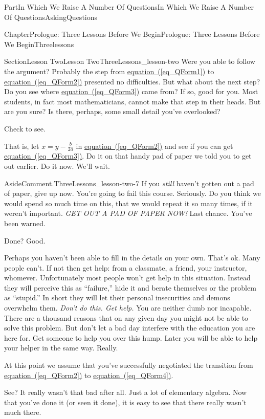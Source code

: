\documentclass[oneside,10pt,]{book}
\newcommand{\xreffont}{\relax}
\numberwithin{equation}{part}
\begin{document}
\begin{partptx}{Part}{In Which We Raise A Number Of Questions}{}{In Which We Raise A Number Of Questions}{}{}{AskingQuestions}
\begin{chapterptx}{Chapter}{Prologue: Three Lessons Before We Begin}{}{Prologue: Three Lessons Before We Begin}{}{}{Threelessons}
\begin{sectionptx}{Section}{Lesson Two}{}{Lesson Two}{}{}{ThreeLessons_lesson-two}
Were you able to follow the argument?  Probably the step from \hyperref[eq_QForm1]{equation~({\xreffont\ref{eq_QForm1}})} to \hyperref[eq_QForm2]{equation~({\xreffont\ref{eq_QForm2}})} presented no difficulties.  But what about the next step?  Do you see where \hyperref[eq_QForm3]{equation~({\xreffont\ref{eq_QForm3}})} came from?  If so, good for you. Most students, in fact most mathematicians, cannot make that step in their heads.  But are you sure?  Is there, perhaps, some small detail you've overlooked?%
\par
Check to see.%
\par
That is, let \(x=y-\frac{b}{2a}\) in \hyperref[eq_QForm2]{equation~({\xreffont\ref{eq_QForm2}})} and see if you can get \hyperref[eq_QForm3]{equation~({\xreffont\ref{eq_QForm3}})}.  Do it on that handy pad of paper we told you to get out earlier.  Do it now.  We'll wait.%
\begin{aside}{Aside}{Comment.}{ThreeLessons_lesson-two-7}%
If you \emph{still} haven't gotten out a pad of paper, give up now.  You're going to fail this course.  Seriously. Do you think we would spend so much time on this, that we would repeat it so many times, if it weren't important. \emph{\emph{GET OUT A PAD OF PAPER NOW!}} Last chance. You've been warned.%
\end{aside}
Done?  Good.%
\par
Perhaps you haven't been able to fill in the details on your own.  That's ok.  Many people can't.  If not then get help: from a classmate, a friend, your instructor, whomever. Unfortunately most people won't get help in this situation. Instead they will perceive this as ``failure,'' hide it and berate themselves or the problem as ``stupid.'' In short they will let their personal insecurities and demons overwhelm them. \emph{Don't do this.  Get help.} You are neither dumb nor incapable.  There are a thousand reasons that on any given day you might not be able to solve this problem.  But don't let a bad day interfere with the education you are here for.  Get someone to help you over this hump.  Later you will be able to help your helper in the same way.  Really.%
\par
At this point we assume that you've successfully negotiated the transition from \hyperref[eq_QForm2]{equation~({\xreffont\ref{eq_QForm2}})} to \hyperref[eq_QForm4]{equation~({\xreffont\ref{eq_QForm4}})}.%
\par
See?  It really wasn't that bad after all.  Just a lot of elementary algebra.  Now that you've done it (or seen it done), it is easy to see that there really wasn't much there.%

\end{sectionptx}
\end{chapterptx}
\end{partptx}
\end{document}
